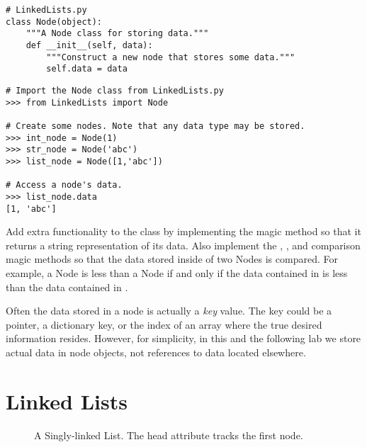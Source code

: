 \begin{lstlisting}
# LinkedLists.py
class Node(object):
	"""A Node class for storing data."""
	def __init__(self, data):
		"""Construct a new node that stores some data."""
		self.data = data
\end{lstlisting}

\begin{lstlisting}
# Import the Node class from LinkedLists.py
>>> from LinkedLists import Node

# Create some nodes. Note that any data type may be stored.
>>> int_node = Node(1)
>>> str_node = Node('abc')
>>> list_node = Node([1,'abc'])

# Access a node's data.
>>> list_node.data
[1, 'abc']
\end{lstlisting}

\begin{problem}
Add extra functionality to the  class by implementing the  magic method so that it returns a string representation of its data.
Also implement the , , and  comparison magic methods so that the data stored inside of two Nodes is compared.
For example, a Node  is less than a Node  if and only if the data contained in  is less than the data contained in .
\end{problem}

\begin{info}
Often the data stored in a node is actually a \emph{key} value.
The key could be a pointer, a dictionary key, or the index of an array where the true desired information resides.
However, for simplicity, in this and the following lab we store actual data in node objects, not references to data located elsewhere.
\end{info}

\section*{Linked Lists}

\begin{figure}
\centering
{}
\caption{A Singly-linked List. The head attribute tracks the first node.}
\label{fig:singly_linked}
\end{figure}

